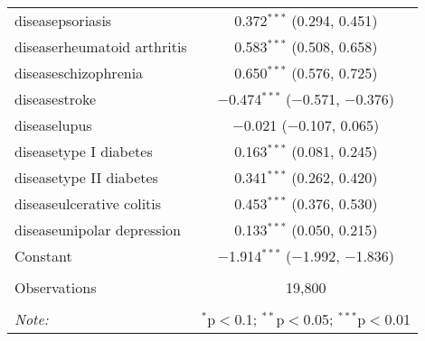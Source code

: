 \begin{table}[!htbp]
\begin{tabular}{@{\extracolsep{5pt}}lc}
  diseasepsoriasis & 0.372$^{***}$ (0.294, 0.451) \\ 
  diseaserheumatoid arthritis & 0.583$^{***}$ (0.508, 0.658) \\ 
  diseaseschizophrenia & 0.650$^{***}$ (0.576, 0.725) \\ 
  diseasestroke & $-$0.474$^{***}$ ($-$0.571, $-$0.376) \\ 
  diseaselupus & $-$0.021 ($-$0.107, 0.065) \\ 
  diseasetype I diabetes & 0.163$^{***}$ (0.081, 0.245) \\ 
  diseasetype II diabetes & 0.341$^{***}$ (0.262, 0.420) \\ 
  diseaseulcerative colitis & 0.453$^{***}$ (0.376, 0.530) \\ 
  diseaseunipolar depression & 0.133$^{***}$ (0.050, 0.215) \\ 
  Constant & $-$1.914$^{***}$ ($-$1.992, $-$1.836) \\ 
 \hline \\[-1.8ex] 
Observations & 19,800 \\ 
\hline 
\hline \\[-1.8ex] 
\textit{Note:}  & \multicolumn{1}{r}{$^{*}$p$<$0.1; $^{**}$p$<$0.05; $^{***}$p$<$0.01} \\ 
\end{tabular} 
\end{table} 
